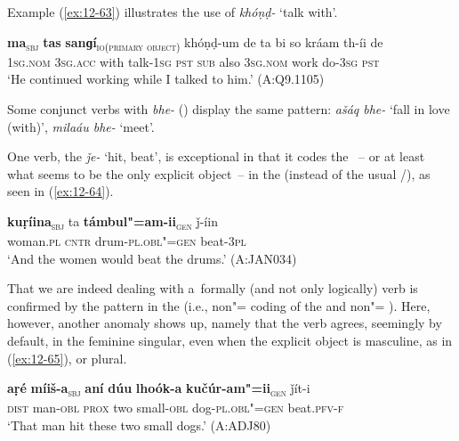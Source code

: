 Example (\ref{ex:12-63}) illustrates the use of \textit{khóṇḍ-} `talk with'.

\begin{exe}
\ex
\label{ex:12-63}
\gll {\ob}\textbf{ma}{\cb}\textsubscript{\textsc{\upshape sbj}} {\ob}\textbf{tas} \textbf{sanɡí}{\cb}\textsubscript{\textsc{\upshape io(primary object)}} khóṇḍ-um de ta bi so kráam th-íi de \\
\textsc{1sg.nom} \textsc{3sg.acc} with talk-\textsc{1sg} \textsc{pst}  \textsc{sub} also \textsc{3sg.nom} work do-\textsc{3sg} \textsc{pst} \\
\glt `He continued working while I talked to him.' (A:Q9.1105)
\end{exe}

Some conjunct verbs with \textit{bhe-} () display the same pattern: \textit{ašáq bhe-} `fall in love (with)', \textit{milaáu bhe-} `meet'.


 One verb, the  \textit{ǰe-} `hit, beat', is exceptional in that it codes the ~-- or at least what seems to be the only explicit object~-- in the  (instead of the usual /), as seen in (\ref{ex:12-64}).

\begin{exe}
\ex
\label{ex:12-64}
\gll {\ob}\textbf{kuṛíina}{\cb}\textsubscript{\textsc{\upshape sbj}} ta {\ob}\textbf{támbul"=am-ii}{\cb}\textsubscript{\textsc{\upshape gen}} ǰ-íin  \\
woman.\textsc{pl} \textsc{cntr} drum-\textsc{pl.obl"=gen} beat-\textsc{3pl}  \\
\glt `And the women would beat the drums.' (A:JAN034)
\end{exe}

That we are indeed dealing with a~formally (and not only logically)  verb is confirmed by the  pattern in the  (i.e., non"= coding of the  and non"= ). Here, however, another anomaly shows up, namely that the verb agrees, seemingly by default, in the feminine singular, even when the explicit object is masculine, as in (\ref{ex:12-65}), or plural.

\begin{exe}
\ex
\label{ex:12-65}
\gll {\ob}\textbf{aṛé} \textbf{míiš-a}{\cb}\textsubscript{\textsc{\upshape sbj}} {\ob}\textbf{aní} \textbf{dúu} \textbf{lhoók-a} \textbf{kučúr-am"=ii}{\cb}\textsubscript{\textsc{\upshape gen}} ǰít-i\\
\textsc{dist} man-\textsc{obl} \textsc{prox} two small-\textsc{obl} dog-\textsc{pl.obl"=gen} beat.\textsc{pfv-f}\\
\glt `That man hit these two small dogs.' (A:ADJ80)
\end{exe}

